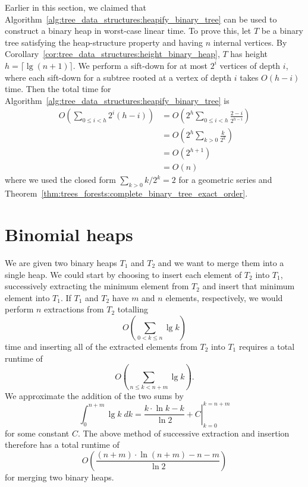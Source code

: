 Earlier in this section, we claimed that
Algorithm~\ref{alg:tree_data_structures:heapify_binary_tree} can be
used to construct a binary heap in worst-case linear time. To prove
this, let $T$ be a binary tree satisfying the heap-structure property
and having $n$ internal vertices. By
Corollary~\ref{cor:tree_data_structures:height_binary_heap}, $T$ has
height $h = \lceil \lg(n + 1) \rceil$. We perform a sift-down for at
most $2^i$ vertices of depth $i$, where each sift-down for a subtree
rooted at a vertex of depth $i$ takes $O(h - i)$ time. Then the total
time for Algorithm~\ref{alg:tree_data_structures:heapify_binary_tree}
is
\begin{align*}
O\left( \sum_{0 \leq i < h} 2^i (h - i) \right)
&=
O\left( 2^h \sum_{0 \leq i < h} \frac{2 - i} {2^{h - i}} \right) \\[4pt]
&=
O\left( 2^h \sum_{k > 0} \frac{k}{2^k} \right) \\[4pt]
&=
O\left( 2^{h + 1} \right) \\[4pt]
&=
O(n)
\end{align*}
where we used the closed form $\sum_{k > 0} k / 2^k = 2$ for a
geometric series and
Theorem~\ref{thm:trees_forests:complete_binary_tree_exact_order}.



\section{Binomial heaps}
\label{sec:tree_data_structures:binomial_heaps}

We are given two binary heaps $T_1$ and $T_2$ and we want to merge
them into a single heap. We could start by choosing to insert each
element of $T_2$ into $T_1$, successively extracting the minimum
element from $T_2$ and insert that minimum element into $T_1$. If
$T_1$ and $T_2$ have $m$ and $n$ elements, respectively, we would
perform $n$ extractions from $T_2$ totalling
\[
O\left( \sum_{0 < k \leq n} \lg k \right)
\]
time and inserting all of the extracted elements from $T_2$ into
$T_1$ requires a total runtime of
\begin{equation}
\label{eqn:tree_data_structures:total_runtime_inserting_n_extra_elements}
O\left( \sum_{n \leq k < n + m} \lg k \right).
\end{equation}
We approximate the addition of the two sums by
\[
\int_0^{n + m} \lg k \; dk
=
\left. \frac{k \cdot \ln k - k} {\ln 2} + C \right|_{k=0}^{k=n+m}
\]
for some constant $C$. The above method of successive extraction and
insertion therefore has a total runtime of
\[
O\left( \frac{(n + m) \cdot \ln(n + m) - n - m} {\ln 2} \right)
\]
for merging two binary heaps.

